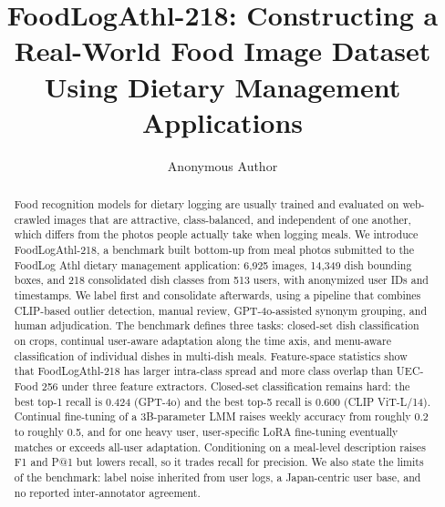 \documentclass[sigconf, nonacm]{acmart}
\begin{document}
\title{FoodLogAthl-218: Constructing a Real-World Food Image Dataset\\ Using Dietary Management Applications}

\author{Anonymous Author}

\begin{abstract}
Food recognition models for dietary logging are usually trained and evaluated on web-crawled images that are attractive, class-balanced, and independent of one another, which differs from the photos people actually take when logging meals. We introduce FoodLogAthl-218, a benchmark built bottom-up from meal photos submitted to the FoodLog Athl dietary management application: 6,925 images, 14,349 dish bounding boxes, and 218 consolidated dish classes from 513 users, with anonymized user IDs and timestamps. We label first and consolidate afterwards, using a pipeline that combines CLIP-based outlier detection, manual review, GPT-4o-assisted synonym grouping, and human adjudication. The benchmark defines three tasks: closed-set dish classification on crops, continual user-aware adaptation along the time axis, and menu-aware classification of individual dishes in multi-dish meals. Feature-space statistics show that FoodLogAthl-218 has larger intra-class spread and more class overlap than UEC-Food 256 under three feature extractors. Closed-set classification remains hard: the best top-1 recall is 0.424 (GPT-4o) and the best top-5 recall is 0.600 (CLIP ViT-L/14). Continual fine-tuning of a 3B-parameter LMM raises weekly accuracy from roughly 0.2 to roughly 0.5, and for one heavy user, user-specific LoRA fine-tuning eventually matches or exceeds all-user adaptation. Conditioning on a meal-level description raises F1 and P@1 but lowers recall, so it trades recall for precision. We also state the limits of the benchmark: label noise inherited from user logs, a Japan-centric user base, and no reported inter-annotator agreement.
\end{abstract}

\maketitle
\end{document}
